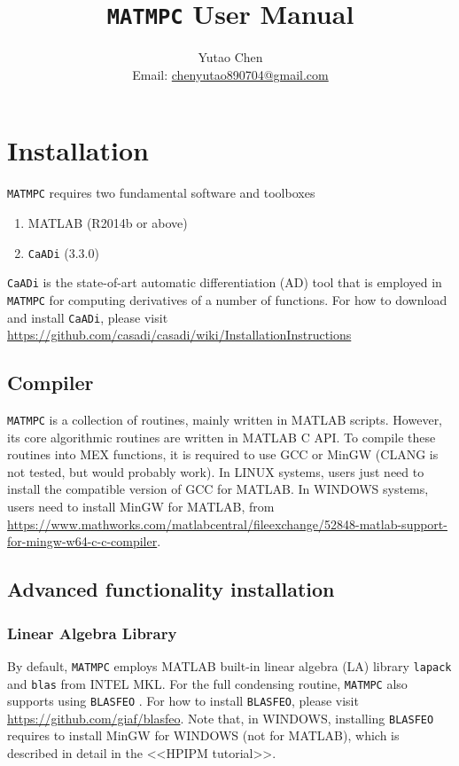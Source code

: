 \documentclass{article}
\newcommand{\software}[1]{{\tt#1}}
\begin{document}
	\title{\software{MATMPC} User Manual}
	\author{Yutao Chen\\ Email: \href{mailto:chenyutao890704@gmail.com}{chenyutao890704@gmail.com}}
	
	\maketitle
	
	\tableofcontents
	
	\newpage
	
\section{Installation}
\software{MATMPC} requires two fundamental software and toolboxes
\begin{enumerate}
	\item MATLAB (R2014b or above) 
	\item \software{CaADi} (3.3.0)
\end{enumerate}
\software{CaADi} is the state-of-art automatic differentiation (AD) tool \cite{andersson2018casadi} that is employed in \software{MATMPC} for computing derivatives of a number of functions. For how to download and install \software{CaADi}, please visit \url{https://github.com/casadi/casadi/wiki/InstallationInstructions}

\subsection{Compiler}
\software{MATMPC} is a collection of routines, mainly written in MATLAB scripts. However, its core algorithmic routines are written in MATLAB C API. To compile these routines into MEX functions, it is required to use GCC or MinGW (CLANG is not tested, but would probably work). In LINUX systems, users just need to install the compatible version of GCC for MATLAB. In WINDOWS systems, users need to install MinGW for MATLAB, from \url{https://www.mathworks.com/matlabcentral/fileexchange/52848-matlab-support-for-mingw-w64-c-c-compiler}.

\subsection{Advanced functionality installation}

\subsubsection{Linear Algebra Library}
By default, \software{MATMPC} employs MATLAB built-in linear algebra (LA) library \software{lapack} and \software{blas} from INTEL MKL. For the full condensing routine, \software{MATMPC} also supports using \software{BLASFEO} \cite{frison2018blasfeo}. For how to install \software{BLASFEO}, please visit \url{https://github.com/giaf/blasfeo}. Note that, in WINDOWS, installing \software{BLASFEO} requires to install MinGW for WINDOWS (not for MATLAB), which is described in detail in the <<HPIPM tutorial>>.
\end{document}
